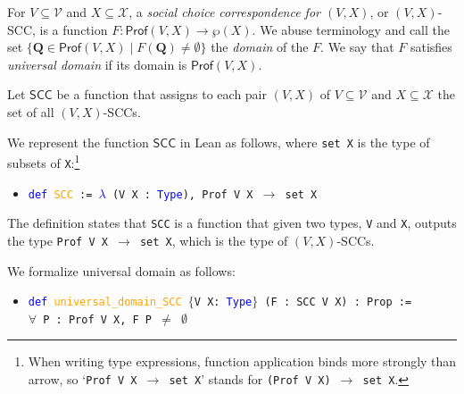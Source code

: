 \documentclass[runningheads]{llncs}
\begin{document}



\begin{definition} \textnormal{For $V\subseteq\mathcal{V}$ and $X\subseteq\mathcal{X}$, a \textit{social choice correspondence for $(V,X)$}, or $(V,X)$-SCC, is a function  $F: \mathsf{Prof}(V,X)\to \wp(X)$. We abuse terminology and call the set $\{\mathbf{Q}\in\mathsf{Prof}(V,X)\mid F(\mathbf{Q})\neq\emptyset \}$ the \textit{domain} of the $F$. We say that $F$ satisfies \textit{universal domain} if its domain is $\mathsf{Prof}(V,X)$.}

\textnormal{Let $\mathsf{SCC}$ be a function that assigns to each pair $(V,X)$ of $V\subseteq\mathcal{V}$ and $X\subseteq\mathcal{X}$ the set of all $(V,X)$-SCCs.}
\end{definition}

We represent the function $\mathsf{SCC}$ in Lean as follows, where \texttt{set X} is the type of subsets of \texttt{X}:\footnote{When writing type expressions, function application binds more strongly than arrow, so `\texttt{Prof V X $\to$ set X}' stands for \texttt{(Prof V X) $\to$ set X}.}
\begin{itemize}
\item[] \texttt{\textcolor{blue}{def} \textcolor{orange}{SCC} := \textcolor{blue}{$\lambda$} (V X : \textcolor{blue}{Type}), Prof V X $\to$ set X}
\end{itemize}
The definition states that \texttt{SCC} is a function that given two types, \texttt{V} and \texttt{X}, outputs the type \texttt{Prof V X $\to$ set X}, which is the type of $(V,X)$-SCCs. 

We formalize universal domain as follows:
\begin{itemize}
\item[] \texttt{\textcolor{blue}{def} \textcolor{orange}{universal\_domain\_SCC} $\{$V X: \textcolor{blue}{Type}$\}$ (F : SCC V X) : Prop :=} \\
\texttt{$\forall$ P : Prof V X, F P $\neq$ $\emptyset$}

\end{itemize}
\end{document}
